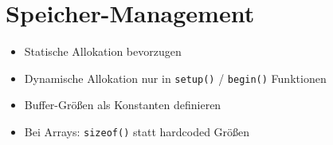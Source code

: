\documentclass[a4paper,11pt]{article}
\begin{document}
\section{Speicher-Management}

\begin{itemize}[leftmargin=2em]
    \item Statische Allokation bevorzugen
    \item Dynamische Allokation nur in \texttt{setup()} / \texttt{begin()} Funktionen
    \item Buffer-Größen als Konstanten definieren
    \item Bei Arrays: \texttt{sizeof()} statt hardcoded Größen
\end{itemize}
\end{document}
